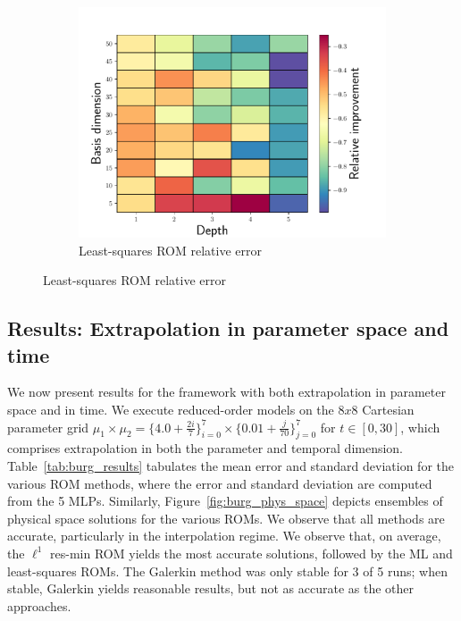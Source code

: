 \documentclass[3p,computermodern,10pt]{elsarticle}
\begin{document}
\begin{figure}
\begin{center}
\begin{subfigure}[t]{0.49\textwidth}
\includegraphics[trim={0cm 0cm 0cm 0cm},clip,width=1.0\linewidth]{code/burgers/synapse_models/basis_study/rel_improvement.pdf}
\caption{Least-squares ROM relative error}
\end{subfigure}
\label{fig:burg_training_results}
\end{center}
\end{figure}



\subsection{Results: Extrapolation in parameter space and time}
We now present results for the framework with both extrapolation in parameter space and in time. We execute reduced-order models on the $8x8$ Cartesian parameter grid  $\mu_1 \times \mu_2 = \{ 4. 0+  \frac{2i}{7} \}_{i=0}^7 \times \{ 0.01 + \frac{j}{70} \}_{j=0}^7$ for $t \in [0,30]$, which comprises extrapolation in both the parameter and temporal dimension. Table~\ref{tab:burg_results} tabulates the mean error and standard deviation for the various ROM methods, where the error and standard deviation are computed from the 5 MLPs. Similarly, Figure~\ref{fig:burg_phys_space} depicts ensembles of physical space solutions for the various ROMs. We observe that all methods are accurate, particularly in the interpolation regime. We observe that, on average, the $\ell^1$ res-min ROM yields the most accurate solutions, followed by the ML and least-squares ROMs. The Galerkin method was only stable for 3 of 5 runs; when stable, Galerkin yields reasonable results, but not as accurate as the other approaches.
\end{document}
